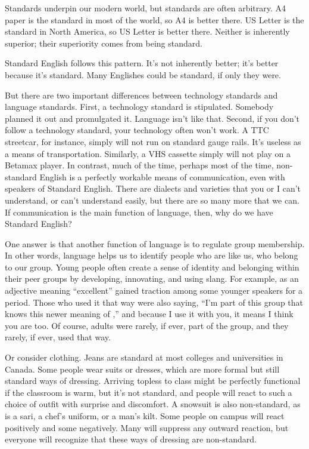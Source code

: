 Standards underpin our modern world, but standards are often arbitrary. A4 paper is the standard in most of the world, so A4 is better there. US Letter is the standard in North America, so US Letter is better there. Neither is inherently superior; their superiority comes from being standard.

Standard English follows this pattern. It's not inherently better; it's better because it's standard. Many Englishes could be standard, if only they were.

But there are two important differences between technology standards and language standards. First, a technology standard is stipulated. Somebody planned it out and promulgated it. Language isn't like that. Second, if you don't follow a technology standard, your technology often won't work. A TTC streetcar, for instance, simply will not run on standard gauge rails. It's useless as a means of transportation. Similarly, a VHS cassette simply will not play on a Betamax player. In contrast, much of the time, perhaps most of the time, non-standard English is a perfectly workable means of communication, even with speakers of Standard English. There are dialects and varieties that you or I can't understand, or can't understand easily, but there are so many more that we can. If communication is the main function of language, then, why do we have Standard English?

One answer is that another function of language is to regulate group membership. In other words, language helps us to identify people who are like us, who belong to our group. Young people often create a sense of identity and belonging within their peer groups by developing, innovating, and using slang. For example,  as an adjective meaning \enquote{excellent} gained traction among some younger speakers for a period. Those who used it that way were also saying, \enquote{I'm part of this group that knows this newer meaning of ,} and because I use it with you, it means I think you are too. Of course, adults were rarely, if ever, part of the group, and they rarely, if ever, used  that way.

Or consider clothing. Jeans are standard at most colleges and universities in Canada. Some people wear suits or dresses, which are more formal but still standard ways of dressing. Arriving topless to class might be perfectly functional if the classroom is warm, but it's not standard, and people will react to such a choice of outfit with surprise and discomfort. A snowsuit is also non-standard, as is a sari, a chef's uniform, or a man's kilt. Some people on campus will react positively and some negatively. Many will suppress any outward reaction, but everyone will recognize that these ways of dressing are non-standard.

